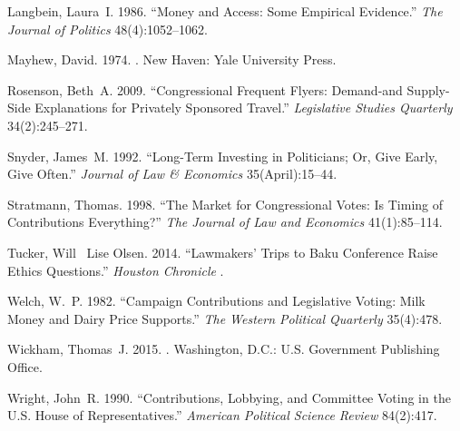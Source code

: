 \documentclass[12pt]{article}                           %
\begin{document}
\begin{thebibliography}{xx}
Langbein, Laura~I. 1986.
\newblock ``Money and {{Access}}: {{Some Empirical Evidence}}.'' {\em The
  Journal of Politics} 48(4):1052--1062.

Mayhew, David. 1974.
.
\newblock New Haven:  {Yale University Press}.

Rosenson, Beth~A. 2009.
\newblock ``Congressional {{Frequent Flyers}}: {{Demand}}-and {{Supply}}-{{Side
  Explanations}} for {{Privately Sponsored Travel}}.'' {\em Legislative Studies
  Quarterly} 34(2):245--271.

Snyder, James~M. 1992.
\newblock ``Long-{{Term Investing}} in {{Politicians}}; {{Or}}, {{Give Early}},
  {{Give Often}}.'' {\em Journal of Law \& Economics} 35(April):15--44.

Stratmann, Thomas. 1998.
\newblock ``The Market for Congressional Votes: {{Is}} Timing of Contributions
  Everything?'' {\em The Journal of Law and Economics} 41(1):85--114.

Tucker, Will \harvardand\ Lise Olsen. 2014.
\newblock ``Lawmakers' Trips to {{Baku}} Conference Raise Ethics Questions.''
  {\em Houston Chronicle} .

Welch, W.~P. 1982.
\newblock ``Campaign {{Contributions}} and {{Legislative Voting}}: {{Milk
  Money}} and {{Dairy Price Supports}}.'' {\em The Western Political Quarterly}
  35(4):478.

Wickham, Thomas~J. 2015.
.
\newblock Washington, D.C.:  {U.S. Government Publishing Office}.

Wright, John~R. 1990.
\newblock ``Contributions, {{Lobbying}}, and {{Committee Voting}} in the
  {{U}}.{{S}}. {{House}} of {{Representatives}}.'' {\em American Political
  Science Review} 84(2):417.

\end{thebibliography}

\newpage
\end{document}
